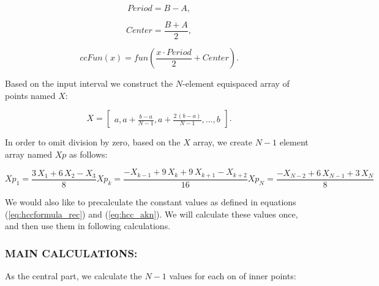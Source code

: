 \documentclass[12pt,twoside,a4paper]{article}
\numberwithin{equation}{subsection}
\numberwithin{figure}{subsection}
\begin{document}
\begin{equation} \label{eq:cci_period}
	Period = B - A,
\end{equation}

\begin{equation} \label{eq:cci_center}
	Center = \frac{B + A}{2},
\end{equation}

\begin{equation} \label{eq:cci_cecfun}
	ccFun(x) = fun( \frac{x \cdot Period}{2} + Center).
\end{equation}


Based on the input interval we construct the $N$-element equispaced array of points named $X$:

\begin{equation}
	X = \begin{bmatrix}
			a, a + \frac{b-a}{N-1}, a + \frac{2 \, (b - a)}{N-1}, \ldots, b
		\end{bmatrix}.
\end{equation}

In order to omit division by zero, based on the $X$ array, we create $N-1$ element array named $Xp$ as follows:

\begin{subequations} \label{eq:cci_cubicinterpolation}
  \begin{equation}   \label{eq:ccicinterp_first}
    Xp_1 = \frac {3 \, X_1 + 6 \, X_2 - X_3}{8}
  \end{equation}
  \begin{equation}   \label{eq:ccicinterp_next}
    Xp_k = \frac { - X_{k - 1} + 9 \, X_k + 9 \, X_{k + 1} - X_{k + 2}}{16}
  \end{equation}
  \begin{equation}   \label{eq:ccicinterp_last}
    Xp_N = \frac { - X_{N - 2} + 6 \, X_{N - 1} + 3 \, X_N}{8}
  \end{equation}
\end{subequations}

We would also like to precalculate the constant values as defined in equations (\ref{eq:hccformula_rec}) and (\ref{eq:hcc_akn}). We will calculate these values once, and then use them in following calculations.

\subsubsection*{MAIN CALCULATIONS:}
As the central part, we calculate the $N-1$ values for each on of inner points: 
\end{document}
